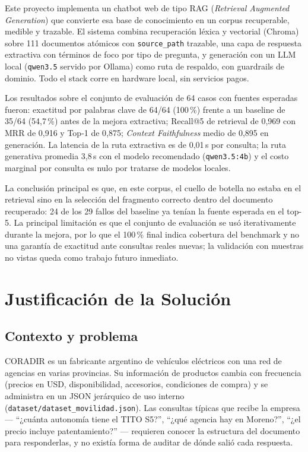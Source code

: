 \documentclass[11pt,a4paper]{article}
\newcommand{\code}[1]{\texttt{#1}}
\begin{document}
Este proyecto implementa un chatbot web de tipo RAG (\emph{Retrieval
Augmented Generation}) que convierte esa base de conocimiento en un corpus
recuperable, medible y trazable. El sistema combina recuperación léxica y
vectorial (Chroma) sobre 111 documentos atómicos con \code{source\_path}
trazable, una capa de respuesta extractiva con términos de foco por tipo de
pregunta, y generación con un LLM local (\code{qwen3.5} servido por Ollama)
como ruta de respaldo, con guardrails de dominio. Todo el stack corre en
hardware local, sin servicios pagos.

Los resultados sobre el conjunto de evaluación de 64 casos con fuentes
esperadas fueron: exactitud por palabras clave de 64/64 (100\,\%) frente a un
baseline de 35/64 (54{,}7\,\%) antes de la mejora extractiva; Recall@5 de
retrieval de 0{,}969 con MRR de 0{,}916 y Top-1 de 0{,}875;
\emph{Context Faithfulness} medio de 0{,}895 en generación. La latencia de la
ruta extractiva es de 0{,}01\,s por consulta; la ruta generativa promedia
3{,}8\,s con el modelo recomendado (\code{qwen3.5:4b}) y el costo marginal por
consulta es nulo por tratarse de modelos locales.

La conclusión principal es que, en este corpus, el cuello de botella no
estaba en el retrieval sino en la selección del fragmento correcto dentro del
documento recuperado: 24 de los 29 fallos del baseline ya tenían la fuente
esperada en el top-5. La principal limitación es que el conjunto de
evaluación se usó iterativamente durante la mejora, por lo que el 100\,\%
final indica cobertura del benchmark y no una garantía de exactitud ante
consultas reales nuevas; la validación con muestras no vistas queda como
trabajo futuro inmediato.

\section{Justificación de la Solución}

\subsection{Contexto y problema}

CORADIR es un fabricante argentino de vehículos eléctricos con una red de
agencias en varias provincias. Su información de productos cambia con
frecuencia (precios en USD, disponibilidad, accesorios, condiciones de
compra) y se administra en un JSON jerárquico de uso interno
(\code{dataset/dataset\_movilidad.json}). Las consultas típicas que recibe la
empresa --- ``¿cuánta autonomía tiene el TITO S5?'', ``¿qué agencia hay en
Moreno?'', ``¿el precio incluye patentamiento?'' --- requieren conocer la
estructura del documento para responderlas, y no existía forma de auditar de
dónde salió cada respuesta.
\end{document}
